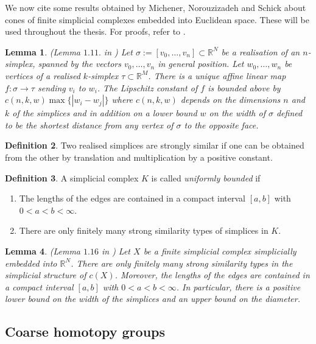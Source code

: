 \documentclass[a4paper,11pt]{article}
\theoremstyle{definition}
\newtheorem{definition}{Definition}[section]
\theoremstyle{plain}
\newtheorem{lemma}[definition]{Lemma}
\theoremstyle{remark}
\begin{document}
We now cite some results obtained by Michener, Norouzizadeh and Schick about cones of finite simplicial complexes embedded into Euclidean space. These will be used throughout the thesis. For proofs, refer to \cite{mitchener2020coarse}.

\begin{lemma} \label{Lbound}(Lemma $1.11.$ in \cite{mitchener2020coarse}) Let $\sigma:=[v_0,\dots,v_{n}]\subset \mathbb{R}^N$ be a realisation of an $n$-simplex, spanned by the vectors $v_0,\dots,v_n$ in general position. Let $w_0,\dots,w_n$ be vertices of a realised $k$-simplex $\tau\subset \mathbb{R}^M$. There is a unique affine linear map $f:\sigma\rightarrow \tau$ sending $v_i$ to $w_i$. The Lipschitz constant of $f$ is bounded above by $c(n,k,w)\max\{|w_i-w_j|\}$ where $c(n,k,w)$ depends on the dimensions $n$ and $k$ of the simplices and in addition on a lower bound $w$ on the width of $\sigma$ defined to be the shortest distance from any vertex of $\sigma$ to the opposite face.
\end{lemma}

\begin{definition} Two realised simplices are strongly similar if one can be obtained from the other by translation and multiplication by a positive constant. 
\end{definition}

\begin{definition} A simplicial complex $K$ is called \textit{uniformly bounded} if
\begin{enumerate} 
\item  The lengths of the edges are contained in a compact interval $[a,b]$ with $0<a<b<\infty$.
\item There are only finitely many strong similarity types of simplices in $K$.
\end{enumerate}
\end{definition}

\begin{lemma} \label{bound} (Lemma $1.16$ in \cite{mitchener2020coarse}) Let $X$ be a finite simplicial complex simplicially embedded into $\mathbb{R}^N$. There are only finitely many strong similarity types in the simplicial structure of $c(X)$. Moreover, the lengths of the edges are contained in a compact interval $[a,b]$ with $0<a<b<\infty$. In particular, there is a positive lower bound on the width of the simplices and an upper bound on the diameter. 
\end{lemma}

 
\subsection{Coarse homotopy groups}
\end{document}
